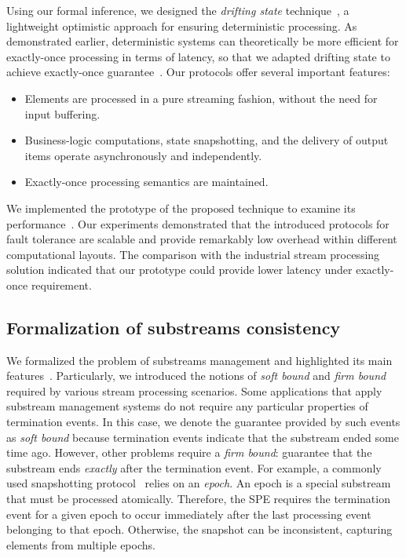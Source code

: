 Using our formal inference, we designed the \textit{drifting state} technique~\cite{we2018adbis}, a lightweight optimistic approach for ensuring deterministic processing. As demonstrated earlier, deterministic systems can theoretically be more efficient for exactly-once processing in terms of latency, so that we adapted drifting state to achieve exactly-once guarantee~\cite{thepaper}. Our protocols offer several important features:

\begin{itemize}
    \item Elements are processed in a pure streaming fashion, without the need for input buffering.
    \item Business-logic computations, state snapshotting, and the delivery of output items operate asynchronously and independently.
    \item Exactly-once processing semantics are maintained.
\end{itemize}

We implemented the prototype of the proposed technique to examine its performance~\cite{we2018adbis, we2018seim, thepaper}. Our experiments demonstrated that the introduced protocols for fault tolerance are scalable and provide remarkably low overhead within different computational layouts. The comparison with the industrial stream processing solution indicated that our prototype could provide lower latency under exactly-once requirement.

\subsection{Formalization of substreams consistency}

We formalized the problem of substreams management and highlighted its main features~\cite{10.1145/3524860.3539809, trofimov2023bounding}. Particularly, we introduced the notions of {\em soft bound} and {\em firm bound} required by various stream processing scenarios. Some applications that apply substream management systems do not require any particular properties of termination events. In this case, we denote the guarantee provided by such events as {\em soft bound} because termination events indicate that the substream ended some time ago. However, other problems require a {\em firm bound}: guarantee that the substream ends {\em exactly} after the termination event. For example, a commonly used snapshotting protocol~\cite{2015arXiv150608603C, jacques2016consistent} relies on an {\em epoch}. An epoch is a special substream that must be processed atomically. Therefore, the SPE requires the termination event for a given epoch to occur immediately after the last processing event belonging to that epoch. Otherwise, the snapshot can be inconsistent, capturing elements from multiple epochs.

